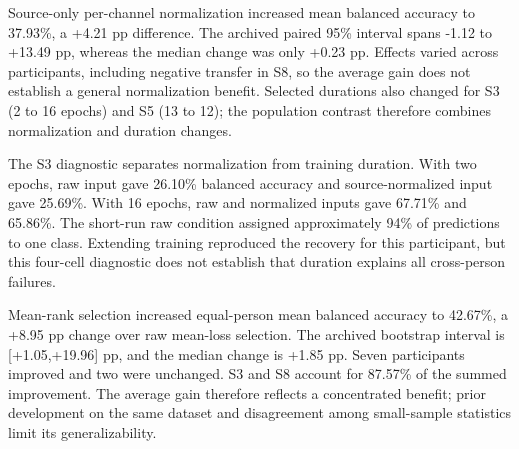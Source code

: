 \documentclass[11pt]{article}
\begin{document}
Source-only per-channel normalization increased mean balanced accuracy to 37.93\%, a +4.21 pp difference. The archived paired 95\% interval spans -1.12 to +13.49 pp, whereas the median change was only +0.23 pp. Effects varied across participants, including negative transfer in S8, so the average gain does not establish a general normalization benefit. Selected durations also changed for S3 (2 to 16 epochs) and S5 (13 to 12); the population contrast therefore combines normalization and duration changes.

The S3 diagnostic separates normalization from training duration. With two epochs, raw input gave 26.10\% balanced accuracy and source-normalized input gave 25.69\%. With 16 epochs, raw and normalized inputs gave 67.71\% and 65.86\%. The short-run raw condition assigned approximately 94\% of predictions to one class. Extending training reproduced the recovery for this participant, but this four-cell diagnostic does not establish that duration explains all cross-person failures.

Mean-rank selection increased equal-person mean balanced accuracy to 42.67\%, a +8.95 pp change over raw mean-loss selection. The archived bootstrap interval is [+1.05,+19.96] pp, and the median change is +1.85 pp. Seven participants improved and two were unchanged. S3 and S8 account for 87.57\% of the summed improvement. The average gain therefore reflects a concentrated benefit; prior development on the same dataset and disagreement among small-sample statistics limit its generalizability.
\end{document}
